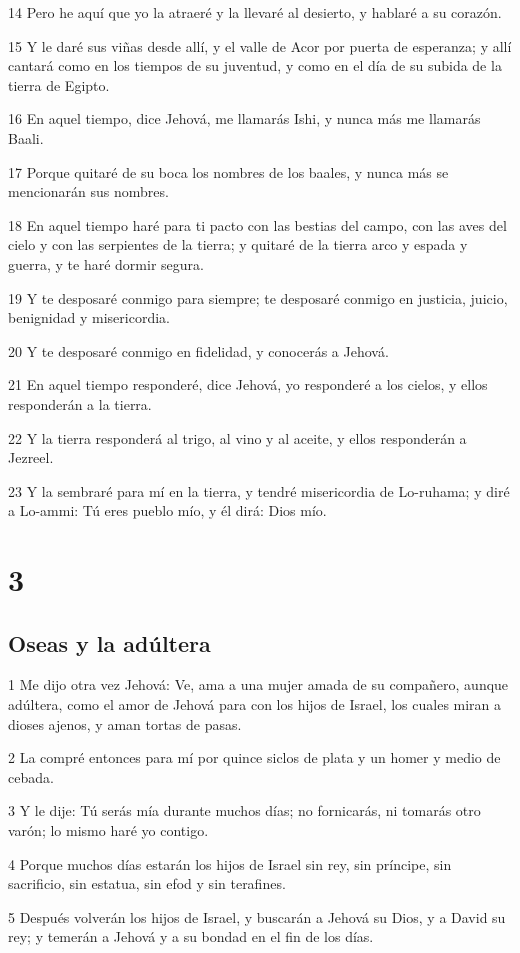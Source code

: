 \par 14 Pero he aquí que yo la atraeré y la llevaré al desierto, y hablaré a su corazón.
\par 15 Y le daré sus viñas desde allí, y el valle de Acor por puerta de esperanza; y allí cantará como en los tiempos de su juventud, y como en el día de su subida de la tierra de Egipto.
\par 16 En aquel tiempo, dice Jehová, me llamarás Ishi, y nunca más me llamarás Baali.
\par 17 Porque quitaré de su boca los nombres de los baales, y nunca más se mencionarán sus nombres.
\par 18 En aquel tiempo haré para ti pacto con las bestias del campo, con las aves del cielo y con las serpientes de la tierra; y quitaré de la tierra arco y espada y guerra, y te haré dormir segura.
\par 19 Y te desposaré conmigo para siempre; te desposaré conmigo en justicia, juicio, benignidad y misericordia.
\par 20 Y te desposaré conmigo en fidelidad, y conocerás a Jehová.
\par 21 En aquel tiempo responderé, dice Jehová, yo responderé a los cielos, y ellos responderán a la tierra.
\par 22 Y la tierra responderá al trigo, al vino y al aceite, y ellos responderán a Jezreel.
\par 23 Y la sembraré para mí en la tierra, y tendré misericordia de Lo-ruhama; y diré a Lo-ammi: Tú eres pueblo mío, y él dirá: Dios mío.

\chapter{3}

\section*{Oseas y la adúltera}

\par 1 Me dijo otra vez Jehová: Ve, ama a una mujer amada de su compañero, aunque adúltera, como el amor de Jehová para con los hijos de Israel, los cuales miran a dioses ajenos, y aman tortas de pasas.
\par 2 La compré entonces para mí por quince siclos de plata y un homer y medio de cebada.
\par 3 Y le dije: Tú serás mía durante muchos días; no fornicarás, ni tomarás otro varón; lo mismo haré yo contigo. 
\par 4 Porque muchos días estarán los hijos de Israel sin rey, sin príncipe, sin sacrificio, sin estatua, sin efod y sin terafines.
\par 5 Después volverán los hijos de Israel, y buscarán a Jehová su Dios, y a David su rey; y temerán a Jehová y a su bondad en el fin de los días.

